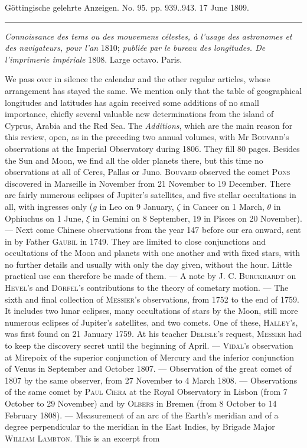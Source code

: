 \clearpage
{}
\hypertarget{native-522-lower}{}\label{native-522-lower}
\begin{center}\small Göttingische gelehrte Anzeigen. No. 95. pp. 939..943. 17 June 1809.\\[3pt]\rule{.72\linewidth}{.3pt}\end{center}

\emph{Connoissance des tems ou des mouvemens célestes, à l'usage des astronomes et des navigateurs, pour l'an} 1810; \emph{publiée par le bureau des longitudes. De l'imprimerie impériale} 1808. Large octavo. Paris.

We pass over in silence the calendar and the other regular articles, whose arrangement has stayed the same. We mention only that the table of geographical longitudes and latitudes has again received some additions of no small importance, chiefly several valuable new determinations from the island of Cyprus, Arabia and the Red Sea. The \emph{Additions}, which are the main reason for this review, open, as in the preceding two annual volumes, with Mr \textsc{Bouvard}’s observations at the Imperial Observatory during 1806. They fill 80 pages. Besides the Sun and Moon, we find all the older planets there, but this time no observations at all of Ceres, Pallas or Juno. \textsc{Bouvard} observed the comet \textsc{Pons} discovered in Marseille in November from 21 November to 19 December. There are fairly numerous eclipses of Jupiter’s satellites, and five stellar occultations in all, with ingresses only ($g$ in Leo on 9 January, $\zeta$ in Cancer on 1 March, $\theta$ in Ophiuchus on 1 June, $\xi$ in Gemini on 8 September, 19 in Pisces on 20 November). — Next come Chinese observations from the year 147 before our era onward, sent in by Father \textsc{Gaubil} in 1749. They are limited to close conjunctions and occultations of the Moon and planets with one another and with fixed stars, with no further details and usually with only the day given, without the hour. Little practical use can therefore be made of them. — A note by \textsc{J. C. Burckhardt} on \textsc{Hevel}’s and \textsc{Dörfel}’s contributions to the theory of cometary motion. — The sixth and final collection of \textsc{Messier}’s observations, from 1752 to the end of 1759. It includes two lunar eclipses, many occultations of stars by the Moon, still more numerous eclipses of Jupiter’s satellites, and two comets. One of these, \textsc{Halley}’s, was first found on 21 January 1759. At his teacher \textsc{Delisle}’s request, \textsc{Messier} had to keep the discovery secret until the beginning of April. — \textsc{Vidal}’s observation at Mirepoix of the superior conjunction of Mercury and the inferior conjunction of Venus in September and October 1807. — Observation of the great comet of 1807 by the same observer, from 27 November to 4 March 1808. — Observations of the same comet by \textsc{Paul Ciera} at the Royal Observatory in Lisbon (from 7 October to 29 November) and by \textsc{Olbers} in Bremen (from 8 October to 14 February 1808). — Measurement of an arc of the Earth’s meridian and of a degree perpendicular to the meridian in the East Indies, by Brigade Major \textsc{William Lambton}. This is an excerpt from 